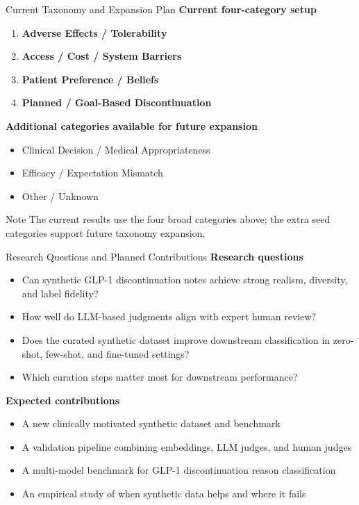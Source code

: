\documentclass[aspectratio=169]{beamer}
\begin{document}
\begin{frame}{Current Taxonomy and Expansion Plan}
    \textbf{Current four-category setup}
    \begin{enumerate}
        \item \textbf{Adverse Effects / Tolerability}
        \item \textbf{Access / Cost / System Barriers}
        \item \textbf{Patient Preference / Beliefs}
        \item \textbf{Planned / Goal-Based Discontinuation}
    \end{enumerate}

    \vspace{0.5em}
    \textbf{Additional categories available for future expansion}
    \begin{itemize}
        \item Clinical Decision / Medical Appropriateness
        \item Efficacy / Expectation Mismatch
        \item Other / Unknown
    \end{itemize}

    \begin{block}{Note}
        The current results use the four broad categories above; the extra seed categories support future taxonomy expansion.
    \end{block}
\end{frame}

\begin{frame}{Research Questions and Planned Contributions}
    \small
    \textbf{Research questions}
    \begin{itemize}
        \item Can synthetic GLP-1 discontinuation notes achieve strong realism, diversity, and label fidelity?
        \item How well do LLM-based judgments align with expert human review?
        \item Does the curated synthetic dataset improve downstream classification in zero-shot, few-shot, and fine-tuned settings?
        \item Which curation steps matter most for downstream performance?
    \end{itemize}

    \textbf{Expected contributions}
    \begin{itemize}
        \item A new clinically motivated synthetic dataset and benchmark
        \item A validation pipeline combining embeddings, LLM judges, and human judges
        \item A multi-model benchmark for GLP-1 discontinuation reason classification
        \item An empirical study of when synthetic data helps and where it fails
    \end{itemize}
\end{frame}
\end{document}
